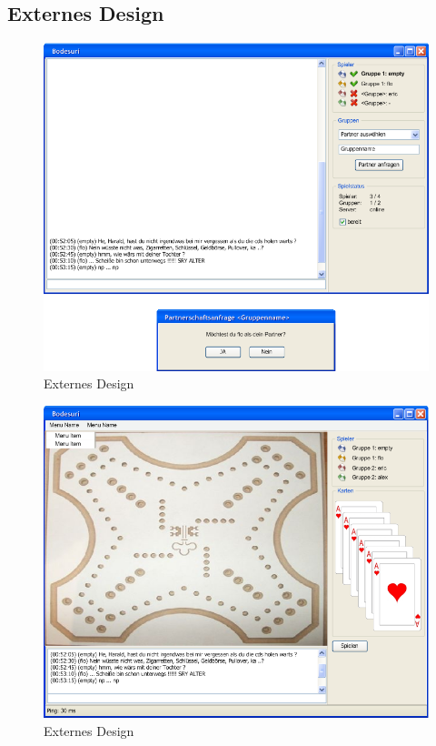 \documentclass[a4paper,12pt,halfparskip,DIV14]{scrartcl}
\begin{document}


\newpage
\subsection{Externes Design}\label{sub:externes_design} %
\begin{figure}
	[htp] \centering 
	\includegraphics[width=1\textwidth]{Externes Design - Lobby.png} \caption{Externes Design}\label{fig:Externes_Design.jpg} 
\end{figure}
\begin{figure}
	[htp] \centering 
	\includegraphics[width=1\textwidth]{Externes Design - Spiel.png} \caption{Externes Design}\label{fig:Externes_Design.jpg} 
\end{figure}
\end{document}
